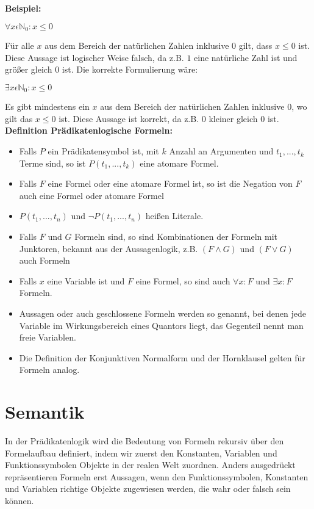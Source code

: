 \textbf{Beispiel:}\\
\begin{center}
$\forall x\epsilon \mathbb{N}_0: x\leq0$
\end{center}
\glqq Für alle $x$ aus dem Bereich der natürlichen Zahlen inklusive 0 gilt, dass $x \leq 0$ ist.\grqq{} \\
Diese Aussage ist logischer Weise falsch, da z.B. $1$ eine natürliche Zahl ist und größer gleich $0$ ist. Die korrekte Formulierung wäre:\\
\begin{center}
$\exists x\epsilon \mathbb{N}_0: x\leq0$
\end{center}
\glqq Es gibt mindestens ein $x$ aus dem Bereich der natürlichen Zahlen inklusive $0$, wo gilt das $x\leq 0$ ist.\grqq{} Diese Aussage ist korrekt, da z.B. $0$ kleiner gleich $0$ ist.\\

\textbf{Definition Prädikatenlogische Formeln:}
\begin{itemize}
\item Falls $P$ ein Prädikatensymbol ist, mit $k$ Anzahl an Argumenten und $t_1,...,t_k$ Terme sind, so ist $P(t_1,...,t_k)$ eine atomare Formel.
\item Falls $F$ eine Formel oder eine atomare Formel ist, so ist die Negation von $F$ auch eine Formel oder atomare Formel
\item $P(t_1,...,t_n)$ und $\neg P(t_1,...,t_n)$ heißen Literale.
\item Falls $F$ und $G$ Formeln sind, so sind Kombinationen der Formeln mit Junktoren, bekannt aus der Aussagenlogik, z.B. $(F \wedge G)$ und $(F \vee G)$ auch Formeln
\item Falls $x$ eine Variable ist und $F$ eine Formel, so sind auch $\forall x:F$ und $\exists x: F$ Formeln. 
\item Aussagen oder auch geschlossene Formeln werden so genannt, bei denen jede Variable im Wirkungsbereich eines Quantors liegt, das Gegenteil nennt man freie Variablen.
\item Die Definition der Konjunktiven Normalform und der Hornklausel gelten für Formeln analog.
\end{itemize}

\cite[vgl. S.38 Def. 3.2]{GrundkursKI}


\section{Semantik}
\label{PSemantik}
\glqq In der Prädikatenlogik wird die Bedeutung von Formeln rekursiv über den Formelaufbau definiert, indem wir zuerst den Konstanten, Variablen und Funktionssymbolen Objekte in der realen Welt zuordnen.\grqq{} \cite[S.38]{GrundkursKI} Anders ausgedrückt repräsentieren Formeln erst Aussagen, wenn den Funktionssymbolen, Konstanten und Variablen richtige Objekte zugewiesen werden, die wahr oder falsch sein können.\\

